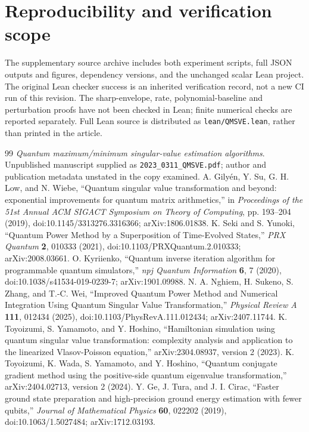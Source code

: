 \documentclass[11pt]{article}
\begin{document}
\section{Reproducibility and verification scope}
The supplementary source archive includes both experiment scripts, full JSON outputs and figures, dependency versions, and the unchanged scalar Lean project. The original Lean checker success is an inherited verification record, not a new CI run of this revision. The sharp-envelope, rate, polynomial-baseline and perturbation proofs have not been checked in Lean; finite numerical checks are reported separately. Full Lean source is distributed as \texttt{lean/QMSVE.lean}, rather than printed in the article.

\begin{thebibliography}{99}
 \emph{Quantum maximum/minimum singular-value estimation algorithms}. Unpublished manuscript supplied as \texttt{2023\_0311\_QMSVE.pdf}; author and publication metadata unstated in the copy examined.
 A. Gily\'en, Y. Su, G. H. Low, and N. Wiebe, ``Quantum singular value transformation and beyond: exponential improvements for quantum matrix arithmetics,'' in \emph{Proceedings of the 51st Annual ACM SIGACT Symposium on Theory of Computing}, pp. 193--204 (2019), doi:10.1145/3313276.3316366; arXiv:1806.01838.
 K. Seki and S. Yunoki, ``Quantum Power Method by a Superposition of Time-Evolved States,'' \emph{PRX Quantum} \textbf{2}, 010333 (2021), doi:10.1103/PRXQuantum.2.010333; arXiv:2008.03661.
 O. Kyriienko, ``Quantum inverse iteration algorithm for programmable quantum simulators,'' \emph{npj Quantum Information} \textbf{6}, 7 (2020), doi:10.1038/s41534-019-0239-7; arXiv:1901.09988.
 N. A. Nghiem, H. Sukeno, S. Zhang, and T.-C. Wei, ``Improved Quantum Power Method and Numerical Integration Using Quantum Singular Value Transformation,'' \emph{Physical Review A} \textbf{111}, 012434 (2025), doi:10.1103/PhysRevA.111.012434; arXiv:2407.11744.
 K. Toyoizumi, S. Yamamoto, and Y. Hoshino, ``Hamiltonian simulation using quantum singular value transformation: complexity analysis and application to the linearized Vlasov-Poisson equation,'' arXiv:2304.08937, version 2 (2023).
 K. Toyoizumi, K. Wada, S. Yamamoto, and Y. Hoshino, ``Quantum conjugate gradient method using the positive-side quantum eigenvalue transformation,'' arXiv:2404.02713, version 2 (2024).
 Y. Ge, J. Tura, and J. I. Cirac, ``Faster ground state preparation and high-precision ground energy estimation with fewer qubits,'' \emph{Journal of Mathematical Physics} \textbf{60}, 022202 (2019), doi:10.1063/1.5027484; arXiv:1712.03193.

\end{thebibliography}
\end{document}
